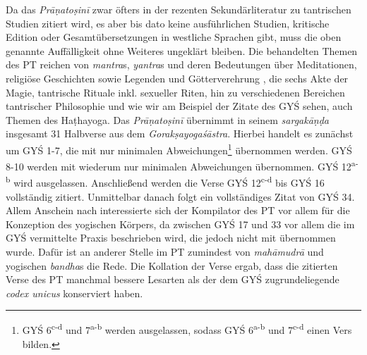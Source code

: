 \documentclass[a4paper,12pt]{article}
\begin{document}
Da das \textit{Prāṇatoṣinī} zwar öfters in der rezenten Sekundärliteratur zu tantrischen Studien zitiert wird, es aber bis dato keine ausführlichen Studien, kritische Edition oder Gesamtübersetzungen in westliche Sprachen gibt, muss die oben genannte Auffälligkeit ohne Weiteres ungeklärt bleiben. Die behandelten Themen des PT reichen von \textit{mantra}s, \textit{yantra}s und deren Bedeutungen \parencite[69-70]{slouber2010} über Meditationen, religiöse Geschichten sowie Legenden und Götterverehrung \parencite[149-50]{kinsley1997}, die sechs Akte der Magie, tantrische Rituale inkl. sexueller Riten, hin zu verschiedenen Bereichen tantrischer Philosophie \parencite[100]{urban2010} und wie wir am Beispiel der Zitate des GYŚ sehen, auch Themen des Haṭhayoga.
Das \textit{Prāṇatoṣinī} übernimmt in seinem \textit{sargakāṇḍa} insgesamt 31 Halbverse aus dem \textit{Gorakṣayogaśāstra}. Hierbei handelt es zunächst um GYŚ 1-7, die mit nur minimalen Abweichungen\footnote{GYŚ 6\textsuperscript{c-d} und 7\textsuperscript{a-b} werden ausgelassen, sodass GYŚ 6\textsuperscript{a-b} und 7\textsuperscript{c-d} einen Vers bilden.} übernommen werden. GYŚ 8-10 werden mit wiederum nur minimalen Abweichungen übernommen. GYŚ 12\textsuperscript{a-b} wird ausgelassen. Anschließend werden die Verse GYŚ 12\textsuperscript{c-d} bis GYŚ 16 vollständig zitiert. Unmittelbar danach folgt ein vollständiges Zitat von GYŚ 34. Allem Anschein nach interessierte sich der Kompilator des PT vor allem für die Konzeption des yogischen Körpers, da zwischen GYŚ 17 und 33 vor allem die im GYŚ vermittelte Praxis beschrieben wird, die jedoch nicht mit übernommen wurde. Dafür ist an anderer Stelle im PT zumindest von \textit{mahāmudrā} und yogischen \textit{bandha}s die Rede. Die Kollation der Verse ergab, dass die zitierten Verse des PT manchmal bessere Lesarten als der dem GYŚ zugrundeliegende \textit{codex unicus} konserviert haben. 
\end{document}

